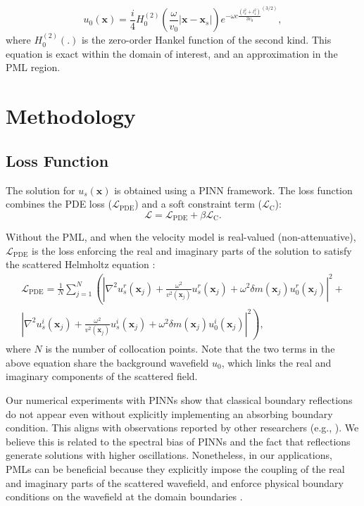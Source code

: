 \documentclass[authoryear, preprint, 12pt]{elsarticle}
\begin{document}
		\begin{equation}
		u_0(\mathbf{x}) = \frac{i}{4} H_0^{(2)}\left(\frac{\omega}{v_0}  |\mathbf{x} - \mathbf{x}_s|\right) e^{-\omega c \frac{(l_x^2+l_z^2)}{3 v_0}^{(3/2)}},
	\end{equation}
	where $H_0^{(2)}\left(.\right)$ is the zero-order Hankel function of the second kind. This equation is exact within the domain of interest, and an approximation in the PML region. 
	
\section{Methodology}
	\subsection{Loss Function}
	
	The solution for $u_s(\mathbf{x})$ is obtained using a PINN framework. The loss function combines the PDE loss ($\mathcal{L}_{\text{PDE}}$) and a soft constraint term ($\mathcal{L}_{\text{C}}$):
	\begin{equation}
		\mathcal{L} = \mathcal{L}_{\text{PDE}} + \beta \mathcal{L}_{\text{C}}.
		\label{eq:loss_total}
	\end{equation}
	
	Without the PML, and when the velocity model is real-valued (non-attenuative), \( \mathcal{L}_{\text{PDE}} \) is the loss enforcing the real and imaginary parts of the solution to satisfy the scattered Helmholtz equation \citep{Alkhalifah2021}:
	\begin{equation}
		\begin{aligned}
			\mathcal{L}_{\text{PDE}} = \frac{1}{N} \sum_{j=1}^{N} \left( 
			\left| \nabla^2 u_s^r(\mathbf{x}_j) + \frac{\omega^2}{v^2(\mathbf{x}_j)} u_s^r(\mathbf{x}_j) + \omega^2 \delta m(\mathbf{x}_j) u_{0}^r(\mathbf{x}_j) \right|^2 
			\right. + \\
			\left. \left| \nabla^2 u_s^i(\mathbf{x}_j) + \frac{\omega^2}{v^2(\mathbf{x}_j)} u_s^i(\mathbf{x}_j) + \omega^2 \delta m(\mathbf{x}_j) u_{0}^i(\mathbf{x}_j) \right|^2 \right),
		\end{aligned}
		\label{eq:loss_pde}
	\end{equation}
	where $N$ is the number of collocation points. Note that the two terms in the above equation share the background wavefield $u_0$, which links the real and imaginary components of the scattered field.
	
Our numerical experiments with PINNs show that classical boundary reflections do not appear even without explicitly implementing an absorbing boundary condition. This aligns with observations reported by other researchers (e.g., \cite{Alkhalifah2021, Rasht-Behesht2022, wu2023}). We believe this is related to the spectral bias of PINNs and the fact that reflections generate solutions with higher oscillations. Nonetheless, in our applications, PMLs can be beneficial because they explicitly impose the coupling of the real and imaginary parts of the scattered wavefield, and enforce physical boundary conditions on the wavefield at the domain boundaries \citep{ wu2023}.
	
\end{document}
